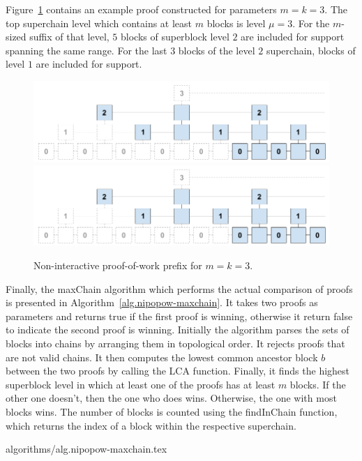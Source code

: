 
Figure~\ref{fig.nipopow} contains an example proof constructed for parameters
$m = k = 3$. The top superchain level which contains at least $m$ blocks is
level $\mu = 3$. For the $m$-sized suffix of that level, $5$ blocks of
superblock level $2$ are included for support spanning the same range. For the
last $3$ blocks of the level $2$ superchain, blocks of level $1$ are included
for support.

\begin{figure}[h]
    \caption{Non-interactive proof-of-work prefix for $m=k = 3$.}
    \centering
    \iftwocolumn
        \includegraphics[width=\columnwidth,keepaspectratio]{figures/non-interactive-popow.png}
    \else
        \includegraphics[width=0.7\columnwidth,keepaspectratio]{figures/non-interactive-popow.png}
    \fi
    \label{fig.nipopow}
\end{figure}

Finally, the maxChain algorithm which performs the actual comparison of proofs
is presented in Algorithm~\ref{alg.nipopow-maxchain}. It takes two proofs as
parameters and returns true if the first proof is winning, otherwise it return
false to indicate the second proof is winning. Initially the algorithm parses
the sets of blocks into chains by arranging them in topological order. It
rejects proofs that are not valid chains. It then computes the lowest common
ancestor block $b$ between the two proofs by calling the LCA function. Finally,
it finds the highest superblock level in which at least one of the proofs has
at least $m$ blocks. If the other one doesn't, then the one who does wins.
Otherwise, the one with most blocks wins. The number of blocks is counted using
the findInChain function, which returns the index of a block within the
respective superchain.

{algorithms/alg.nipopow-maxchain.tex}
